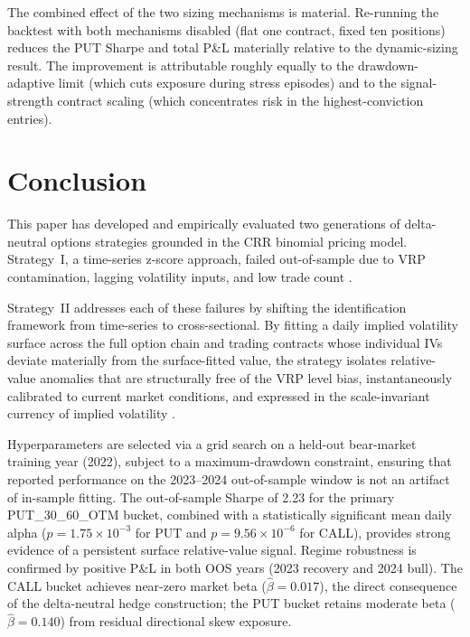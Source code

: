 \documentclass[10pt,twocolumn]{article}
\begin{document}
The combined effect of the two sizing mechanisms is material.  Re-running the
backtest with both mechanisms disabled (flat one contract, fixed ten
positions) reduces the PUT Sharpe and total P\&L materially relative to the
dynamic-sizing result.  The improvement is attributable roughly equally to
the drawdown-adaptive limit (which cuts exposure during stress episodes) and
to the signal-strength contract scaling (which concentrates risk in the
highest-conviction entries).


\section{Conclusion}

This paper has developed and empirically evaluated two generations of
delta-neutral options strategies grounded in the CRR binomial pricing model.
Strategy~I, a time-series z-score approach, failed out-of-sample due to VRP
contamination, lagging volatility inputs, and low trade count \cite{broadie2009,
carr2009, bailey2014}.

Strategy~II addresses each of these failures by shifting the
identification framework from time-series to cross-sectional. By fitting a
daily implied volatility surface across the full option chain and trading
contracts whose individual IVs deviate materially from the surface-fitted
value, the strategy isolates relative-value anomalies that are structurally
free of the VRP level bias, instantaneously calibrated to current market
conditions, and expressed in the scale-invariant currency of implied
volatility \cite{gatheral2006}.

Hyperparameters are selected via a grid search on a held-out bear-market
training year (2022), subject to a maximum-drawdown constraint, ensuring that
reported performance on the 2023--2024 out-of-sample window is not an
artifact of in-sample fitting. The out-of-sample Sharpe of 2.23 for
the primary PUT\_30\_60\_OTM bucket, combined with a statistically significant
mean daily alpha ($p = 1.75 \times 10^{-3}$ for PUT and $p = 9.56 \times
10^{-6}$ for CALL), provides strong evidence of a persistent surface
relative-value signal.  Regime robustness is confirmed by positive P\&L in
both OOS years (2023 recovery and 2024 bull). The CALL bucket achieves
near-zero market beta ($\hat{\beta} = 0.017$), the direct consequence of the
delta-neutral hedge construction; the PUT bucket retains moderate beta
($\hat{\beta} = 0.140$) from residual directional skew exposure.
\end{document}
